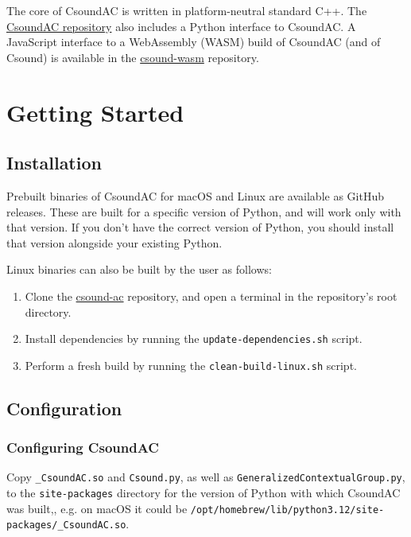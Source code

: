 \documentclass[letterpaper,10pt,DIV=12,parskip=half]{scrartcl}
\begin{document}
\noindent The core of CsoundAC is written in platform-neutral standard C++. The \href{https://github.com/gogins/csound-ac}{CsoundAC repository} also includes a Python interface to CsoundAC. A JavaScript interface to a WebAssembly (WASM) build of CsoundAC (and of Csound) is available in the \href{https://github.com/gogins/csound-wasm}{csound-wasm} repository. 

\section{Getting Started}

\subsection{Installation}

Prebuilt binaries of CsoundAC for macOS and Linux are available as GitHub releases. These are built for a specific version of Python, and will work only with that version. If you don't have the correct version of Python, you should install that version alongside your existing Python. 

Linux binaries can also be built by the user as follows:

\begin{enumerate}
\item Clone the \href{https://github.com/gogins/csound-ac}{csound-ac} repository, and open a terminal in the repository's root directory.
\item Install dependencies by running the \lstinline{update-dependencies.sh} script.
\item Perform a fresh build by running the \lstinline{clean-build-linux.sh} script.
\end{enumerate}

\subsection{Configuration}

\subsubsection{Configuring CsoundAC}

Copy  \lstinline{_CsoundAC.so} and \lstinline{Csound.py}, as well as \lstinline{GeneralizedContextualGroup.py}, to the \lstinline{site-packages} directory for the version of Python with which CsoundAC was built,, e.g. on macOS it could be \lstinline|/opt/homebrew/lib/python3.12/site-packages/_CsoundAC.so|.
\end{document}
